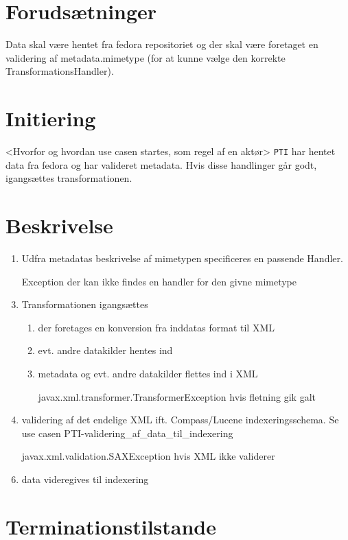 \documentclass{article}
\begin{document}
\section{Forudsætninger}

Data skal være hentet fra fedora repositoriet og der skal være
foretaget en validering af metadata.mimetype (for at kunne vælge den
korrekte TransformationsHandler).

\section{Initiering}
<Hvorfor og hvordan use casen startes, som regel af en aktør>
\texttt{PTI} har hentet data fra fedora og har valideret
metadata. Hvis disse handlinger går godt, igangsættes
transformationen.

\section{Beskrivelse}
\begin{enumerate}
\item Udfra metadatas beskrivelse af mimetypen specificeres en passende Handler.
\item [Exception] der kan ikke findes en handler for den givne mimetype
\item Transformationen igangsættes
  \begin{enumerate}
  \item der foretages en konversion fra inddatas format til XML
  \item evt. andre datakilder hentes ind
  \item metadata og evt. andre datakilder flettes ind i XML

  \item [javax.xml.transformer.TransformerException] hvis fletning gik galt
  \end{enumerate}
\item validering af det endelige XML ift. Compass/Lucene
  indexeringsschema. Se use casen
  PTI-validering\_af\_data\_til\_indexering
\item [javax.xml.validation.SAXException] hvis XML ikke validerer
\item data videregives til indexering
\end{enumerate}

\section{Terminationstilstande}
\end{document}
